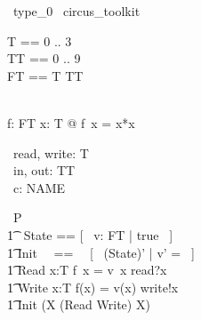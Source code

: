 
\begin{zsection}
  \SECTION\ type\_0 \parents\ circus\_toolkit
\end{zsection}

\begin{zed}
	T == 0 .. 3 \\
	TT == 0 .. 9 \\
	FT == T \fun TT \\
    [NAME, PERSON] \\
\end{zed}

\begin{axdef}
    f: FT 
    \where
    \forall x: T @ f~x = x*x
\end{axdef}

\begin{circus}
	\circchannel\ read, write: T\\
	\circchannel\ in, out: TT\\
	\circchannel\ c: \power NAME \\
\end{circus}

\begin{circus}
    \circprocess\ P \circdef \circbegin \\
        \t1 \circstate\ State == [~ v: FT | true ~] \\
        \t1 Init ~~==~~ [~ (State)' | v' = \emptyset ~] \\
        \t1 Read \circdef \circvar x:T \circspot \lcircguard f~x = v~x \rcircguard \circguard read?x \then \Skip \\
        \t1 Write \circdef \circvar x:T \circspot \lcircguard f(x) = v(x) \rcircguard \circguard write!x \then \Skip \\
        \t1 \circspot \lschexpract Init \rschexpract \circseq (\circmu X \circspot (Read \extchoice Write) \circseq X) \\ 
	\circend
\end{circus}

